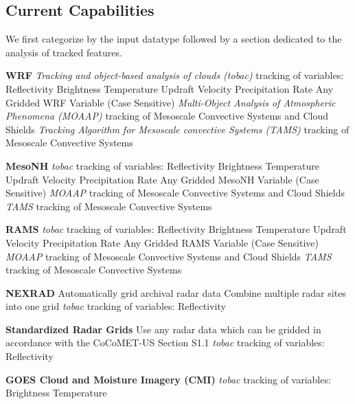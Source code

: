 \documentclass[10pt,a4paper]{article}
\begin{document}
		\subsection{Current Capabilities}
		We first categorize by the input datatype followed by a section dedicated to the analysis of tracked features.
		
		\begin{outline}
			\1 \textbf{WRF}
				\2 \emph{Tracking and object-based analysis of clouds (tobac)} tracking of variables:
					\3 Reflectivity
					\3 Brightness Temperature
					\3 Updraft Velocity
					\3 Precipitation Rate
					\3 Any Gridded WRF Variable (Case Sensitive)
				\2 \emph{Multi-Object Analysis of Atmospheric Phenomena (MOAAP)} tracking of Mesoscale Convective Systems and Cloud Shields
				\2 \emph{Tracking Algorithm for Mesoscale convective Systems (TAMS)} tracking of Mesoscale Convective Systems
				
			\1 \textbf{MesoNH}
				\2 \emph{tobac} tracking of variables:
					\3 Reflectivity
					\3 Brightness Temperature
					\3 Updraft Velocity
					\3 Precipitation Rate
					\3 Any Gridded MesoNH Variable (Case Sensitive)
				\2 \emph{MOAAP} tracking of Mesoscale Convective Systems and Cloud Shields
				\2 \emph{TAMS} tracking of Mesoscale Convective Systems
				
			\1 \textbf{RAMS}
				\2 \emph{tobac} tracking of variables:
					\3 Reflectivity
					\3 Brightness Temperature
					\3 Updraft Velocity
					\3 Precipitation Rate
					\3 Any Gridded RAMS Variable (Case Sensitive)
				\2 \emph{MOAAP} tracking of Mesoscale Convective Systems and Cloud Shields
				\2 \emph{TAMS} tracking of Mesoscale Convective Systems
				
			\1 \textbf{NEXRAD}
				\2 Automatically grid archival radar data
				\2 Combine multiple radar sites into one grid
				\2 \emph{tobac} tracking of variables:
					\3 Reflectivity
					
			\1 \textbf{Standardized Radar Grids}
				\2 Use any radar data which can be gridded in accordance with the CoCoMET-US Section S1.1
				\2 \emph{tobac} tracking of variables:
					\3 Reflectivity
					
			\1 \textbf{GOES Cloud and Moisture Imagery (CMI)}
				\2 \emph{tobac} tracking of variables:
					\3 Brightness Temperature 
					

\end{outline}
\end{document}
